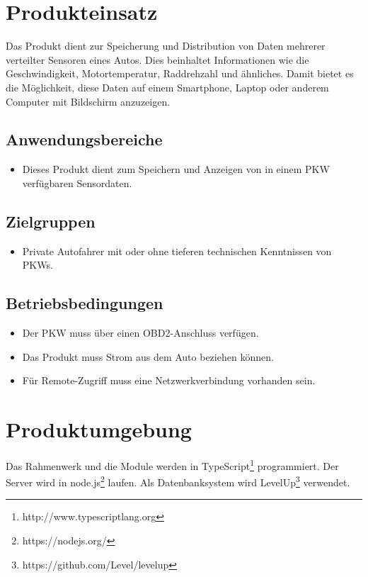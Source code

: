 \documentclass[pflichtenheft.tex]{subfiles}
\begin{document}
\chapter{Produkteinsatz}
Das Produkt dient zur Speicherung und Distribution von Daten mehrerer verteilter Sensoren eines Autos. Dies beinhaltet Informationen wie die Geschwindigkeit, Motortemperatur, Raddrehzahl und ähnliches. Damit bietet es die Möglichkeit, diese Daten  auf einem Smartphone, Laptop oder anderem Computer mit Bildschirm anzuzeigen.


\section{Anwendungsbereiche}
\begin{itemize}
\item
Dieses Produkt dient zum Speichern und Anzeigen von in einem PKW verfügbaren Sensordaten.
\end{itemize}


\section{Zielgruppen}
\begin{itemize}
\item
Private Autofahrer mit oder ohne tieferen technischen Kenntnissen von PKWs. 
\end{itemize}


\section{Betriebsbedingungen}
\begin{itemize}
\item
Der PKW muss über einen OBD2-Anschluss verfügen.
\item
Das Produkt muss Strom aus dem Auto beziehen können.
\item
Für Remote-Zugriff muss eine Netzwerkverbindung vorhanden sein.
\end{itemize}


\chapter{Produktumgebung}
Das Rahmenwerk und die Module werden in TypeScript\footnote{http://www.typescriptlang.org} programmiert. Der Server wird in node.js\footnote{https://nodejs.org/} laufen. Als Datenbanksystem wird LevelUp\footnote{https://github.com/Level/levelup} verwendet.
\end{document}
